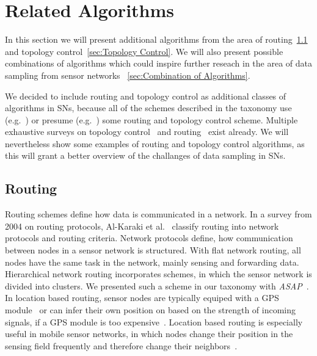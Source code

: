 \section{Related Algorithms}
\label{sec:Related Algorithms}

In this section we will present additional algorithms from the area of
routing~\ref{sec:Routing} and topology control~\ref{sec:Topology Control}. We
will also present possible combinations of algorithms which could inspire
further reseach in the area of data sampling from sensor networks
~\ref{sec:Combination of Algorithms}.

We decided to include routing and topology control as additional classes of
algorithms in \acp{SN}, because all of the schemes described in the taxonomy
use (e.g.~\cite{padhy2006utility}) or presume
(e.g.~\cite{silberstein2006constraint}) some routing and topology control
scheme. Multiple exhaustive surveys on topology control~\cite{aziz2013survey,
li2013survey} and routing~\cite{al2004routing, pantazis2013energy,
singh2010routing} exist already. We will nevertheless show some examples of
routing and topology control algorithms, as this will grant a better overview
of the challanges of data sampling in \acp{SN}.

\subsection{Routing}
\label{sec:Routing}

Routing schemes define how data is communicated in a network. In a survey from
2004 on routing protocols, Al-Karaki et al.~\cite{al2004routing} classify
routing into network protocols and routing criteria. Network protocols define,
how communication between nodes in a sensor network is structured. With flat
network routing, all nodes have the same task in the network, mainly sensing
and forwarding data. Hierarchical network routing incorporates schemes, in
which the sensor network is divided into clusters. We presented such a scheme
in our taxonomy with \textit{ASAP}~\cite{gedik2007asap}. In location based
routing, sensor nodes are typically equiped with a GPS
module~\cite{xu2001geography} or can infer their own position on based on the
strength of incoming signals, if a GPS module is too
expensive~\cite{hu2004localization}. Location based routing is especially
useful in mobile sensor networks, in which nodes change their position in the
sensing field frequently and therefore change their
neighbors~\cite{hu2004localization}.

